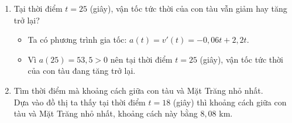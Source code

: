\begin{bt}
{\begin{enumerate}
\begin{itemize}
			\end{itemize}
			\item Tại thời điểm $t=25$ (giây), vận tốc tức thời của con tàu vẫn giảm hay tăng trở lại?
			\begin{itemize}
				\item Ta có phương trình gia tốc: $a(t)=v'(t)=-0{,}06t+2{,}2t$.
				\item Vì $a(25)=53{,}5>0$ nên tại thời điểm $t=25$ (giây), vận tốc tức thời của con tàu đang tăng trở lại.
			\end{itemize}
			\item Tìm thời điểm mà khoảng cách giữa con tàu và Mặt Trăng nhỏ nhất.\\
			Dựa vào đồ thị ta thấy tại thời điểm $t=18$ (giây) thì khoảng cách giữa con tàu và Mặt Trăng nhỏ nhất, khoảng cách này bằng $8{,}08$ km.
		\end{enumerate}
	}
\end{bt}
